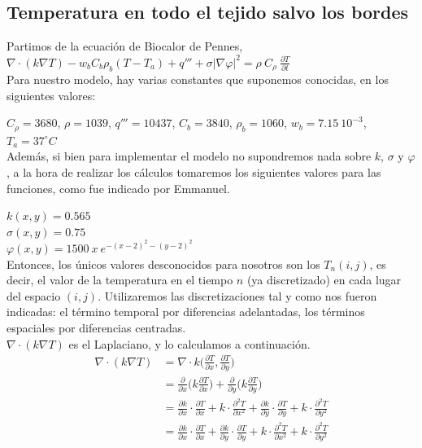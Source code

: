 \documentclass[a4paper]{article}
\begin{document}
\subsection{Temperatura en todo el tejido salvo los bordes}
Partimos de la ecuación de Biocalor de Pennes, 
$\nabla \cdot (k \nabla T) - w_b C_b \rho_b (T-T_a) + q''' + \sigma |\nabla \varphi|^2 = \rho \ C_\rho \ \frac{\partial T}{\partial t}$ \\

Para nuestro modelo, hay varias constantes que suponemos conocidas, en los siguientes valores:

$C_\rho= 3680$, $\rho= 1039$, $q'''= 10437$, $C_b= 3840$, $\rho_b= 1060$, $w_b=7.15 \ 10^{-3}$, $T_a = 37^\circ C$ \\

Además, si bien para implementar el modelo no supondremos nada sobre $k$, $\sigma$ y $\varphi$, a la hora de realizar los cálculos tomaremos los siguientes valores para las funciones,
como fue indicado por Emmanuel. 

$k(x,y)=0.565$ \\
$\sigma(x,y)=0.75$ \\
$\varphi(x,y)=1500 \ x \ e^{-(x-2)^2-(y-2)^2}$ \\

Entonces, los únicos valores desconocidos para nosotros son los $T_n(i,j)$, es decir, el valor de la temperatura en el tiempo $n$ (ya discretizado) en cada lugar del espacio $(i,j)$.
Utilizaremos las discretizaciones tal y como nos fueron indicadas: el término temporal por diferencias adelantadas, los términos espaciales por diferencias centradas. \\

$\nabla \cdot (k \nabla T)$ es el Laplaciano, y lo calculamos a continuación.
\begin{equation} \label{eq:nablaT}
\begin{split}
\nabla \cdot (k \nabla T) & = \nabla \cdot k \bigg(\frac{\partial T}{\partial x}, \frac{\partial T}{\partial y}\bigg) \\
& = \frac{\partial}{\partial x} \bigg(k \frac{\partial T}{\partial x}\bigg) + \frac{\partial}{\partial y} \bigg(k \frac{\partial T}{\partial y}\bigg) \\
& = \frac{\partial k}{\partial x} \cdot \frac{\partial T}{\partial x} + k \cdot \frac{\partial^2 T}{\partial x^2} + \frac{\partial k}{\partial y} \cdot \frac{\partial T}{\partial y} + k \cdot \frac{\partial^2 T}{\partial y^2} \\
 & = \frac{\partial k}{\partial x} \cdot \frac{\partial T}{\partial x} + \frac{\partial k}{\partial y} \cdot \frac{\partial T}{\partial y} + k \cdot \frac{\partial^2 T}{\partial x^2} + k \cdot \frac{\partial^2 T}{\partial y^2}
\end{split}
\end{equation}
\end{document}
